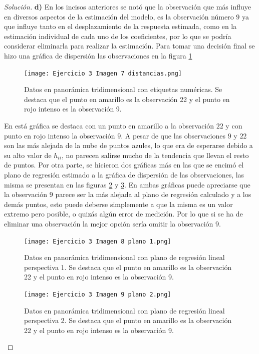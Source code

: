 \documentclass[10.5pt,notitlepage]{article}
\newenvironment{solucion}
  {\begin{proof}[Solución]}
  {\end{proof}}
\theoremstyle{plain}
\begin{document}
\begin{solucion}
\noindet \textbf{d)} En los incisos anteriores se notó que la observación que más influye en diversos aspectos de la estimación del modelo, es la observación número \(9\) ya que influye tanto en el desplazamiento de la respuesta estimada, como en la estimación individual de cada uno de los coeficientes, por lo que se podría considerar eliminarla para realizar la estimación. Para tomar una decisión final se hizo una gráfica de dispersión las observaciones en la figura \ref{fig:15}
\begin{figure}[htb]
 \centering
 \texttt{[image: Ejercicio 3 Imagen 7 distancias.png]}
 \caption{Datos en panorámica tridimensional con etiquetas numéricas. Se destaca que el punto en amarillo es la observación 22 y el punto en rojo intenso es la observación 9.}
\label{fig:15}
\end{figure}
En está gráfica se destaca con un punto en amarillo a la observación \(22\) y con punto en rojo intenso la observación \(9\). A pesar de que las observaciones \(9\) y \(22\) son las más alejada de la nube de puntos azules, lo que era de esperarse debido a su alto valor de  \(h_{ii}\), no parecen salirse mucho de la tendencia que llevan el resto de puntos. Por otra parte, se hicieron dos gráficas más en las que se encimó el plano de regresión estimado a la gráfica de dispersión de las observaciones, las misma se presentan en las figuras \ref{fig:16} y \ref{fig:17}. En ambas gráficas puede apreciarse que la observación \(9\) parece ser la más alejada al plano de regresión calculado y a los demás puntos, esto puede deberse simplemente a que la misma es un valor extremo pero posible, o quizás algún error de medición. Por lo que si se ha de eliminar una observación la mejor opción sería omitir la observación \(9\).\\
\begin{figure}[htb]
 \centering
 \texttt{[image: Ejercicio 3 Imagen 8 plano 1.png]}
 \caption{Datos en panorámica tridimensional con plano de regresión lineal perspectiva 1. Se destaca que el punto en amarillo es la observación 22 y el punto en rojo intenso es la observación 9.}
\label{fig:16}
\end{figure}

\begin{figure}[htb]
 \centering
 \texttt{[image: Ejercicio 3 Imagen 9 plano 2.png]}
 \caption{Datos en panorámica tridimensional con plano de regresión lineal perspectiva 2. Se destaca que el punto en amarillo es la observación 22 y el punto en rojo intenso es la observación 9.}
\label{fig:17}
\end{figure}


\end{solucion}
\end{document}

